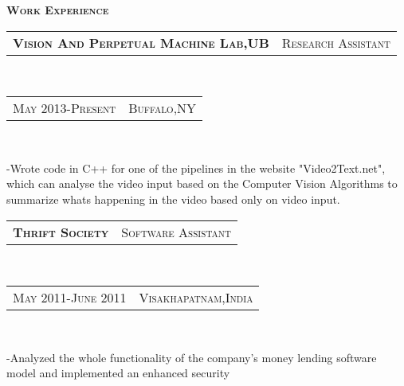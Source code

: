 \documentclass[10pt,a4paper,oneside]{article}
\begin{document}
    \begin{minipage}[t]{0.63\textwidth}
        \vspace{0pt}
        \textcolor{light-gray}{\textbf{\large W\textsc{ork} E\textsc{xperience}}}
        \vspace{10pt}\\
        \begin{tabular}{c|c}
            \textbf{\normalsize V\textsc{ision} A\textsc{nd} P\textsc{erpetual} M\textsc{achine} L\textsc{ab},UB}
            &\textmd{\normalsize R\textsc{esearch} A\textsc{ssistant}}
        \end{tabular}\\
        \textcolor{light-gray}{
            \begin{tabular}{c|c}
                {\small M\textsc{ay 2013}-P\textsc{resent}}
               &{\small B\textsc{uffalo},NY}
            \end{tabular}
        }\\ 
        \vspace{-4mm}
        \begin{adjustwidth}{7pt}{0pt}
            {\footnotesize -Wrote code in C++ for one of the pipelines in the website "Video2Text.net", which can analyse 
            the video input based on the Computer Vision Algorithms to
            summarize whats happening in the video based only on video input.}\\
        \end{adjustwidth}
        \begin{tabular}{c|c}
            \textbf{\normalsize T\textsc{hrift} S\textsc{ociety}}
            &\textmd{\normalsize S\textsc{oftware} A\textsc{ssistant}}
        \end{tabular}\\
        \textcolor{light-gray}{
            \begin{tabular}{c|c}
                {\small M\textsc{ay 2011}-J\textsc{une 2011}}
                &{\small V\textsc{isakhapatnam},I\textsc{ndia}}
            \end{tabular}
        }\\ 
        \vspace{-4mm}
        \begin{adjustwidth}{7pt}{0pt}
            {\footnotesize -Analyzed the whole functionality of the company's money lending software model and implemented an enhanced security
}
\end{adjustwidth}
\end{minipage}
\end{document}
